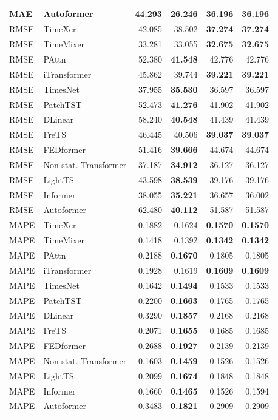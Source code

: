 \begin{longtable}{llrrrr}
MAE & Autoformer & 44.293 & \textbf{26.246} & 36.196 & 36.196 \\
\midrule
RMSE & TimeXer & 42.085 & 38.502 & \textbf{37.274} & \textbf{37.274} \\
RMSE & TimeMixer & 33.281 & 33.055 & \textbf{32.675} & \textbf{32.675} \\
RMSE & PAttn & 52.380 & \textbf{41.548} & 42.776 & 42.776 \\
RMSE & iTransformer & 45.862 & 39.744 & \textbf{39.221} & \textbf{39.221} \\
RMSE & TimesNet & 37.955 & \textbf{35.530} & 36.597 & 36.597 \\
RMSE & PatchTST & 52.473 & \textbf{41.276} & 41.902 & 41.902 \\
RMSE & DLinear & 58.240 & \textbf{40.548} & 41.439 & 41.439 \\
RMSE & FreTS & 46.445 & 40.506 & \textbf{39.037} & \textbf{39.037} \\
RMSE & FEDformer & 51.416 & \textbf{39.666} & 44.674 & 44.674 \\
RMSE & Non-stat. Transformer & 37.187 & \textbf{34.912} & 36.127 & 36.127 \\
RMSE & LightTS & 43.598 & \textbf{38.539} & 39.176 & 39.176 \\
RMSE & Informer & 38.055 & \textbf{35.221} & 36.657 & 36.002 \\
RMSE & Autoformer & 62.480 & \textbf{40.112} & 51.587 & 51.587 \\
\midrule
MAPE & TimeXer & 0.1882 & 0.1624 & \textbf{0.1570} & \textbf{0.1570} \\
MAPE & TimeMixer & 0.1418 & 0.1392 & \textbf{0.1342} & \textbf{0.1342} \\
MAPE & PAttn & 0.2188 & \textbf{0.1670} & 0.1805 & 0.1805 \\
MAPE & iTransformer & 0.1928 & 0.1619 & \textbf{0.1609} & \textbf{0.1609} \\
MAPE & TimesNet & 0.1642 & \textbf{0.1494} & 0.1533 & 0.1533 \\
MAPE & PatchTST & 0.2200 & \textbf{0.1663} & 0.1765 & 0.1765 \\
MAPE & DLinear & 0.3290 & \textbf{0.1857} & 0.2168 & 0.2168 \\
MAPE & FreTS & 0.2071 & \textbf{0.1655} & 0.1685 & 0.1685 \\
MAPE & FEDformer & 0.2688 & \textbf{0.1927} & 0.2139 & 0.2139 \\
MAPE & Non-stat. Transformer & 0.1603 & \textbf{0.1459} & 0.1526 & 0.1526 \\
MAPE & LightTS & 0.2099 & \textbf{0.1674} & 0.1848 & 0.1848 \\
MAPE & Informer & 0.1660 & \textbf{0.1465} & 0.1526 & 0.1594 \\
MAPE & Autoformer & 0.3483 & \textbf{0.1821} & 0.2909 & 0.2909 \\
\end{longtable}
\endgroup

